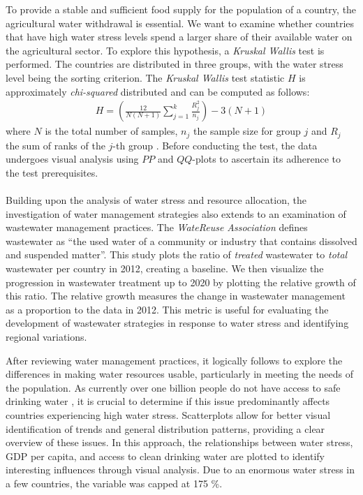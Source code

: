 \documentclass{article}
\theoremstyle{plain}
\theoremstyle{definition}
\theoremstyle{remark}
\begin{document}
To provide a stable and sufficient food supply for the population of a country, the agricultural water withdrawal is essential. We want to examine whether countries that have high water stress levels spend a larger share of their available water on the agricultural sector. To explore this hypothesis, a \textit{Kruskal Wallis} test is performed. The countries are distributed in three groups, with the water stress level being the sorting criterion. The \textit{Kruskal Wallis} test statistic $H$ is approximately \textit{chi-squared} distributed and can be computed as follows:
\begin{align}
    H = \left(\frac{12}{N(N+1)} \sum_{j = 1}^k \frac{R_j^2}{n_j}\right) -3(N+1)
\end{align}
where $N$ is the total number of samples, $n_j$ the sample size for group $j$ and $R_j$ the sum of ranks of the $j$-th group \cite{Ostertagova2014}.
Before conducting the test, the data undergoes visual analysis using $PP$ and $QQ$-plots to ascertain its adherence to the test prerequisites.\\\\
Building upon the analysis of water stress and resource allocation, the investigation of water management strategies also extends to an examination of wastewater management practices. The \textit{WateReuse Association} defines wastewater as “the used water of a community or industry that contains dissolved and suspended matter”.
This study plots the ratio of \textit{treated} wastewater to \textit{total} wastewater per country in 2012, creating a baseline. We then visualize the progression in wastewater treatment up to 2020 by plotting the relative growth of this ratio. The relative growth measures the change in wastewater management as a proportion to the data in 2012. This metric is useful for evaluating the development of wastewater strategies in response to water stress and identifying regional variations.

After reviewing water management practices, it logically follows to explore the differences in making water resources usable, particularly in meeting the needs of the population.
As currently over one billion people do not have access to safe drinking water \cite{Programme2023}, it is crucial to determine if this issue predominantly affects countries experiencing high water stress.
Scatterplots allow for better visual identification of trends and general distribution patterns, providing a clear overview of these issues.
In this approach, the relationships between water stress, GDP per capita, and access to clean drinking water are plotted to identify interesting influences through visual analysis. 
Due to an enormous water stress in a few countries, the variable was capped at 175 \%.
\end{document}
